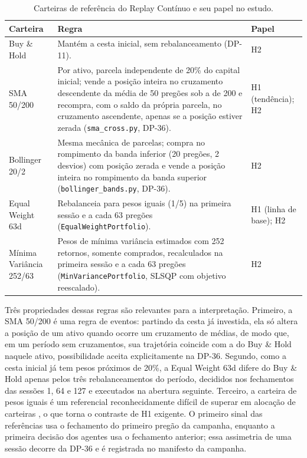 \begin{table}[htbp]
\centering
\caption{Carteiras de referência do Replay Contínuo e seu papel no estudo.}
\label{tab:met-referencias}
\small
\begin{tabular}{>{\raggedright\arraybackslash}p{2.6cm} >{\raggedright\arraybackslash}p{8.4cm} >{\raggedright\arraybackslash}p{3.2cm}}
\toprule
\textbf{Carteira} & \textbf{Regra} & \textbf{Papel} \\
\midrule
Buy \& Hold & Mantém a cesta inicial, sem rebalanceamento (\mbox{DP-11}). & H2 \\
SMA 50/200 & Por ativo, parcela independente de 20\% do capital inicial; vende a posição inteira no cruzamento descendente da média de 50 pregões sob a de 200 e recompra, com o saldo da própria parcela, no cruzamento ascendente, apenas se a posição estiver zerada (\texttt{sma\_cross.py}, \mbox{DP-36}). & H1 (tendência); H2 \\
Bollinger 20/2 & Mesma mecânica de parcelas; compra no rompimento da banda inferior (20 pregões, 2 desvios) com posição zerada e vende a posição inteira no rompimento da banda superior (\texttt{bollinger\_bands.py}, \mbox{DP-36}). & H2 \\
Equal Weight 63d & Rebalanceia para pesos iguais (1/5) na primeira sessão e a cada 63 pregões (\texttt{EqualWeightPortfolio}). & H1 (linha de base); H2 \\
Mínima Variância 252/63 & Pesos de mínima variância estimados com 252 retornos, somente comprados, recalculados na primeira sessão e a cada 63 pregões (\texttt{MinVariancePortfolio}, SLSQP com objetivo reescalado). & H2 \\
\bottomrule
\end{tabular}
\end{table}

Três propriedades dessas regras são relevantes para a interpretação. Primeiro, a SMA 50/200 é uma regra de eventos: partindo da cesta já investida, ela só altera a posição de um ativo quando ocorre um cruzamento de médias, de modo que, em um período sem cruzamentos, sua trajetória coincide com a do Buy \& Hold naquele ativo, possibilidade aceita explicitamente na \mbox{DP-36}. Segundo, como a cesta inicial já tem pesos próximos de 20\%, a Equal Weight 63d difere do Buy \& Hold apenas pelos três rebalanceamentos do período, decididos nos fechamentos das sessões 1, 64 e 127 e executados na abertura seguinte. Terceiro, a carteira de pesos iguais é um referencial reconhecidamente difícil de superar em alocação de carteiras \citep{DeMiguel2009}, o que torna o contraste de H1 exigente. O primeiro sinal das referências usa o fechamento do primeiro pregão da campanha, enquanto a primeira decisão dos agentes usa o fechamento anterior; essa assimetria de uma sessão decorre da \mbox{DP-36} e é registrada no manifesto da campanha.

